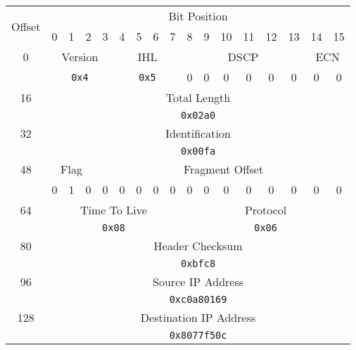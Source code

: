 \begin{table}[htpb]
	\centering
	\label{my-label}
	\begin{tabular}{|c|cccccccccccccccc|}
		\hline
		\multirow{2}{*}{Offset} & \multicolumn{16}{c|}{Bit Position} \\
		& 0 & 1 & 2 & 3 & 4 & 5 & 6 & 7 & 8 & 9 & 10 & 11 & 12 & 13 & 14 & 15 \\ \hline 
		\multicolumn{1}{|c|}{0} & \multicolumn{4}{c|}{Version} & \multicolumn{4}{c|}{IHL} & \multicolumn{6}{|c|}{DSCP} & \multicolumn{2}{c|}{ECN} \\ \cline{2-17} 
		\multicolumn{1}{|c|}{} & 
			\multicolumn{4}{c|}{\texttt{0x4}} &  
			\multicolumn{4}{c|}{\texttt{0x5}} &  
			0 & 0 & 0 & 0 & 0 & \multicolumn{1}{c|}{0} & 
			0 & 0 \\
			\hline 
		\multicolumn{1}{|c|}{16} & \multicolumn{16}{c|}{Total Length} \\ \cline{2-17} 
		\multicolumn{1}{|c|}{} & 
			\multicolumn{16}{c|}{\texttt{0x02a0}} \\ 
			\hline 
		\multicolumn{1}{|c|}{32} & \multicolumn{16}{c|}{Identification} \\ \cline{2-17} 
		\multicolumn{1}{|c|}{} & 
			\multicolumn{16}{c|}{\texttt{0x00fa}} \\ 
			\hline 
		\multicolumn{1}{|c|}{48} & \multicolumn{3}{c|}{Flag} & \multicolumn{13}{c|}{Fragment Offset} \\ \cline{2-17} 
		\multicolumn{1}{|c|}{} & 
			0 & 1 & \multicolumn{1}{c|}{0} & 
			0 & 0 & 0 & 0 & 0 & 0 & 0 & 0 & 0 & 0 & 0 & 0 & 0 \\ 
			\hline 
		\multicolumn{1}{|c|}{64} & \multicolumn{8}{c|}{Time To Live} & \multicolumn{8}{c|}{Protocol} \\ \cline{2-17} 
		\multicolumn{1}{|c|}{} & 
			\multicolumn{8}{c|}{\texttt{0x08}} & 
			\multicolumn{8}{c|}{\texttt{0x06}} \\ 
			\hline 
		\multicolumn{1}{|c|}{80} & \multicolumn{16}{c|}{Header Checksum} \\ \cline{2-17} 
		\multicolumn{1}{|c|}{} & 
			\multicolumn{16}{c|}{\texttt{0xbfc8}} \\ 
			\hline
		\multicolumn{1}{|c|}{96} & \multicolumn{16}{c|}{Source IP Address} \\ \cline{2-17} 
		\multicolumn{1}{|c|}{} & 
			\multicolumn{16}{c|}{\multirow{2}{*}{\texttt{0xc0a80169}}} \\
			\multicolumn{1}{|c|}{} & \multicolumn{16}{l|}{} \\ 
			\hline
		\multicolumn{1}{|c|}{128} & \multicolumn{16}{c|}{Destination IP Address} \\ \cline{2-17}
			\multicolumn{1}{|c|}{} & \multicolumn{16}{c|}{\multirow{2}{*}{\texttt{0x8077f50c}}} \\
			\multicolumn{1}{|c|}{} & \multicolumn{16}{l|}{} \\ 
			\hline 
	\end{tabular}
\end{table}

